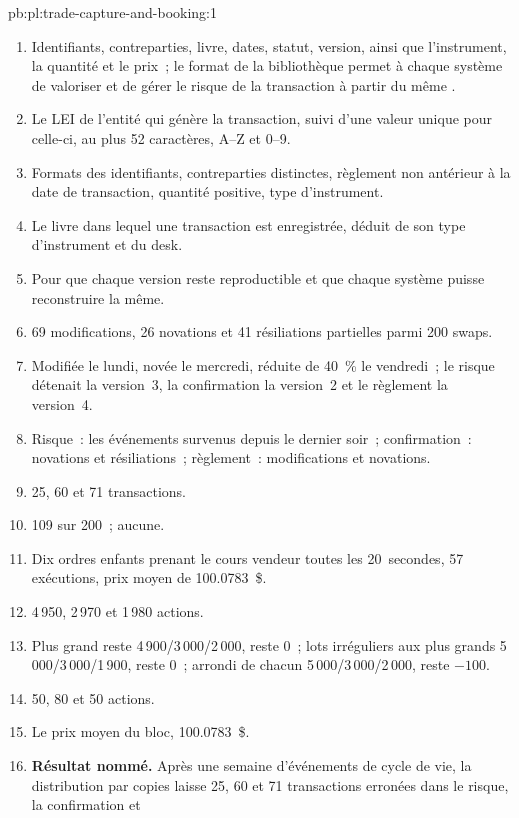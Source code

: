 \begin{solution}{pb:pl:trade-capture-and-booking:1}
\begin{enumerate}
\item Identifiants, contreparties, livre, dates, statut, version, ainsi que l'instrument, la quantité et le prix~; le format de la bibliothèque permet à chaque système de valoriser et
de gérer le risque de la transaction à partir du même .
\item Le LEI de l'entité qui génère la transaction, suivi d'une valeur unique pour celle-ci, au plus 52 caractères, A--Z et 0--9.
\item Formats des identifiants, contreparties distinctes, règlement non antérieur à la date de transaction, quantité positive, type d'instrument.
\item Le livre dans lequel une transaction est enregistrée, déduit de son type d'instrument et du desk.
\item Pour que chaque version reste reproductible et que chaque système puisse reconstruire la même.
\item 69 modifications, 26 novations et 41 résiliations partielles parmi 200 swaps.
\item Modifiée le lundi, novée le mercredi, réduite de 40~\% le vendredi~; le risque détenait la version~3, la confirmation la version~2 et le règlement la version~4.
\item Risque~: les événements survenus depuis le dernier soir~; confirmation~: novations et résiliations~; règlement~: modifications et novations.
\item 25, 60 et 71 transactions.
\item 109 sur 200~; aucune.
\item Dix ordres enfants prenant le cours vendeur toutes les 20~secondes, 57 exécutions, prix moyen de 100.0783~\$.
\item 4\,950, 2\,970 et 1\,980 actions.
\item Plus grand reste 4\,900/3\,000/2\,000, reste 0~; lots irréguliers aux plus grands 5\,000/3\,000/1\,900, reste 0~; arrondi de chacun
5\,000/3\,000/2\,000, reste $-100$.
\item 50, 80 et 50 actions.
\item Le prix moyen du bloc, 100.0783~\$.
\item \textbf{Résultat nommé.} Après une semaine d'événements de cycle de vie, la distribution par copies laisse 25, 60 et 71 transactions erronées dans le risque, la confirmation et

\end{enumerate}
\end{solution}
